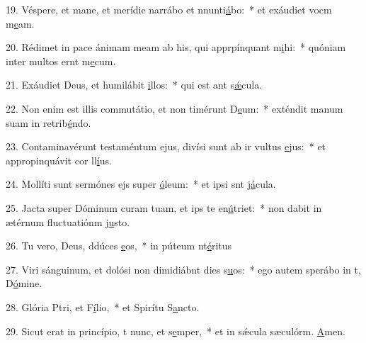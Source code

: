 19. Véspere, et mane, et merídie narrábo et nnunti\uline{á}bo:~* et exáudiet vocm m\uline{e}am.\par 
20. Rédimet in pace ánimam meam ab his, qui apprpínquant m\uline{i}hi:~* quóniam inter multos ernt m\uline{e}cum.\par 
21. Exáudiet Deus, et humilábit \uline{i}llos:~* qui est ant s\uline{ǽ}cula.\par 
22. Non enim est illis commutátio, et non timérunt D\uline{e}um:~* exténdit manum suam in retrib\uline{é}ndo.\par 
23. Contaminavérunt testaméntum ejus, divísi sunt ab ir vultus \uline{e}jus:~* et appropinquávit cor ll\uline{í}us.\par 
24. Mollíti sunt sermónes ejs super \uline{ó}leum:~* et ipsi snt j\uline{á}cula.\par 
25. Jacta super Dóminum curam tuam, et ips te en\uline{ú}triet:~* non dabit in ætérnum fluctuatiónm j\uline{u}sto.\par 
26. Tu vero, Deus, ddúces \uline{e}os,~* in púteum nt\uline{é}ritus\par 
27. Viri sánguinum, et dolósi non dimidiábnt dies s\uline{u}os:~* ego autem sperábo in t, D\uline{ó}mine.\par 
28. Glória Ptri, et F\uline{í}lio,~* et Spirítu S\uline{a}ncto.\par 
29. Sicut erat in princípio, t nunc, et s\uline{e}mper,~* et in sǽcula sæculórm. \uline{A}men.\par 
